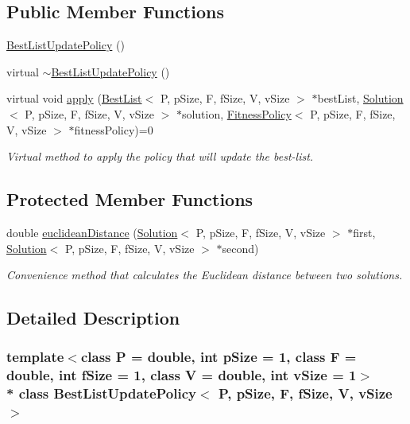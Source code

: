 \subsection*{Public Member Functions}
\begin{DoxyCompactItemize}
\item 
\hyperlink{classBestListUpdatePolicy_a0a23a636003eb43d09e16f21133459f5}{Best\+List\+Update\+Policy} ()
\item 
virtual \hyperlink{classBestListUpdatePolicy_a6c17a69a8f1c010e7ce3f524f05ec98b}{$\sim$\+Best\+List\+Update\+Policy} ()
\item 
virtual void \hyperlink{classBestListUpdatePolicy_a591442e3329323b350971b6a55195916}{apply} (\hyperlink{classBestList}{Best\+List}$<$ P, p\+Size, F, f\+Size, V, v\+Size $>$ $\ast$best\+List, \hyperlink{classSolution}{Solution}$<$ P, p\+Size, F, f\+Size, V, v\+Size $>$ $\ast$solution, \hyperlink{classFitnessPolicy}{Fitness\+Policy}$<$ P, p\+Size, F, f\+Size, V, v\+Size $>$ $\ast$fitness\+Policy)=0
\begin{DoxyCompactList}\small\item\em Virtual method to apply the policy that will update the best-\/list. \end{DoxyCompactList}\end{DoxyCompactItemize}
\subsection*{Protected Member Functions}
\begin{DoxyCompactItemize}
\item 
double \hyperlink{classBestListUpdatePolicy_a6987f90d6d9e5fec813f5aa53fe47ce3}{euclidean\+Distance} (\hyperlink{classSolution}{Solution}$<$ P, p\+Size, F, f\+Size, V, v\+Size $>$ $\ast$first, \hyperlink{classSolution}{Solution}$<$ P, p\+Size, F, f\+Size, V, v\+Size $>$ $\ast$second)
\begin{DoxyCompactList}\small\item\em Convenience method that calculates the Euclidean distance between two solutions. \end{DoxyCompactList}\end{DoxyCompactItemize}


\subsection{Detailed Description}
\subsubsection*{template$<$class P = double, int p\+Size = 1, class F = double, int f\+Size = 1, class V = double, int v\+Size = 1$>$\\*
class Best\+List\+Update\+Policy$<$ P, p\+Size, F, f\+Size, V, v\+Size $>$}

